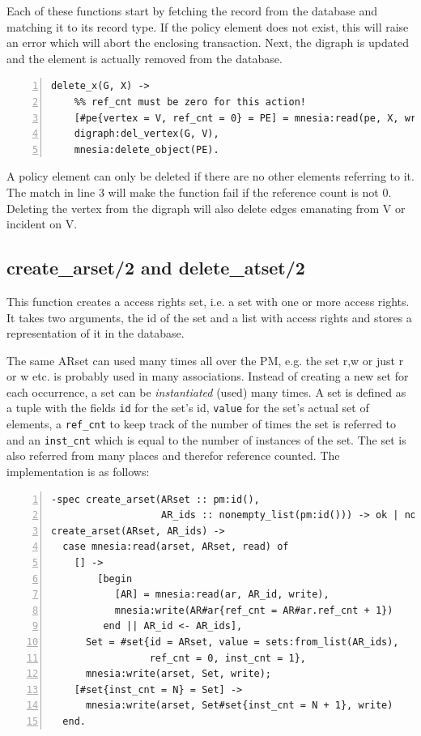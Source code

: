 \documentclass[12pt,a4paper,titlepage]{book}
\begin{document}
		Each of these functions start by fetching the record from the database and matching it to its record type. If the policy element does not exist, this will raise an error which will abort the enclosing transaction. Next, the digraph is updated and the element is actually removed from the database.
		
		\begin{lstlisting}[caption={delete\_x/2}, basicstyle=\footnotesize, breaklines=false, numbers=left]
delete_x(G, X) ->
    %% ref_cnt must be zero for this action!  
    [#pe{vertex = V, ref_cnt = 0} = PE] = mnesia:read(pe, X, write),
    digraph:del_vertex(G, V),
    mnesia:delete_object(PE). \end{lstlisting}
    
	    A policy element can only be deleted if there are no other elements referring to it. The match in line 3 will make the function fail if the reference count is not 0. Deleting the vertex from the digraph will also delete edges emanating from V or incident on V.

	\subsection{create\_arset/2 and delete\_atset/2}\label{create_ar_atset}
	
		This function creates a access rights set, i.e. a set with one or more access rights. It takes two arguments, the id of the set and a list with access rights and stores a representation of it in the database.
		
		The same ARset can used many times all over the PM, e.g. the set {r,w} or just {r} or {w} etc. is probably used in many associations. Instead of creating a new set for each occurrence, a set can be \emph{instantiated} (used) many times.  A set is defined as a tuple with the fields \lstinline|id| for the set's id, \lstinline|value| for the set's actual set of elements, a \lstinline|ref_cnt|  to keep track of the number of times the set is referred to and an \lstinline|inst_cnt| which is equal to the number of instances of the set. The set is also referred from many places and therefor reference counted. The implementation is as follows:
		
		\begin{lstlisting}[caption={create\_arset/2}, basicstyle=\footnotesize, breaklines=false, numbers=left]
-spec create_arset(ARset :: pm:id(),
                   AR_ids :: nonempty_list(pm:id())) -> ok | no_return().
create_arset(ARset, AR_ids) ->
  case mnesia:read(arset, ARset, read) of
    [] ->
        [begin 
           [AR] = mnesia:read(ar, AR_id, write),
           mnesia:write(AR#ar{ref_cnt = AR#ar.ref_cnt + 1})
         end || AR_id <- AR_ids],
      Set = #set{id = ARset, value = sets:from_list(AR_ids),
                 ref_cnt = 0, inst_cnt = 1},
      mnesia:write(arset, Set, write);
    [#set{inst_cnt = N} = Set] ->
      mnesia:write(arset, Set#set{inst_cnt = N + 1}, write)
  end. \end{lstlisting}
	
\end{document}

